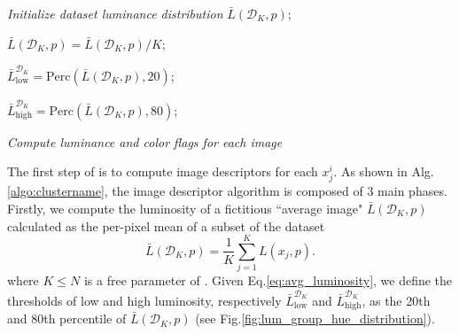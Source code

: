 \documentclass[12pt]{spieman}  %
\begin{document}
\begin{spacing}{2}
\begin{linenumbers}
\begin{algorithm}
\textit{Initialize dataset luminance distribution} $\bar{L}(\mathcal{D}_K,p)$;


$\bar{L}(\mathcal{D}_K,p) = \bar{L}(\mathcal{D}_K,p) / K$;

$\bar{L}^{\mathcal{D}_K}_{\mathrm{low}} = \mathrm{Perc}(\bar{L}(\mathcal{D}_K,p),20)$; 

$\bar{L}^{\mathcal{D}_K}_{\mathrm{high}} = \mathrm{Perc}(\bar{L}(\mathcal{D}_K,p),80)$; 



\textit{Compute luminance and color flags for each image}


\label{algo:clustername}
\end{algorithm}



The first step of \clustname is to compute image descriptors for each $x_j^{i}$. As shown in Alg.\ref{algo:clustername}, the image descriptor algorithm is composed of 3 main phases. Firstly,  we compute the luminosity of a fictitious ``average image" $\bar{L}(\mathcal{D}_K, p)$  calculated as the per-pixel mean of a subset of the dataset
\begin{equation}
	\bar{L}(\mathcal{D}_K, p) = \frac{1}{K} \sum_{j=1}^{K} L(x_{j}, p).
	\label{eq:avg_luminosity}
\end{equation}
where $K \leq N$ is a free parameter of \clustname. Given Eq.\ref{eq:avg_luminosity}, we define the thresholds of low and high luminosity, respectively $\bar{L}^{\mathcal{D}_K}_{\mathrm{low}}$ and $\bar{L}^{\mathcal{D}_K}_{\mathrm{high}}$, as the 20th and 80th percentile of $\bar{L}(\mathcal{D}_K, p)$ (see Fig.\ref{fig:lum_group_hue_distribution}).  



\end{linenumbers}
\end{spacing}
\end{document}
